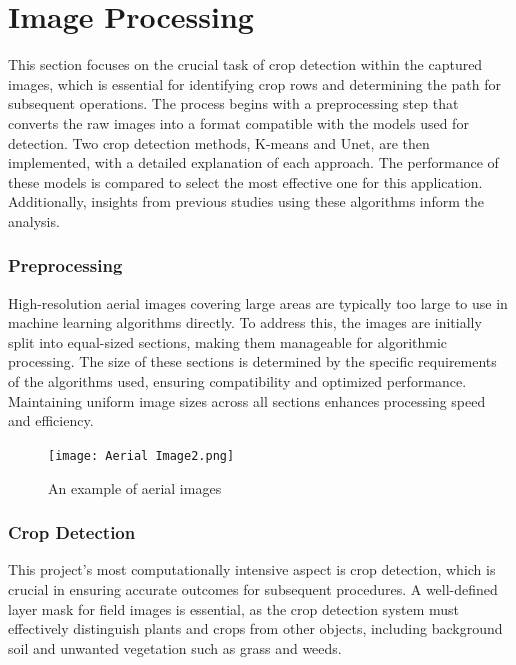 \documentclass[conference]{IEEEtran}
\begin{document}
\section{Image Processing}
This section focuses on the crucial task of crop detection within the captured images, which is essential for identifying crop rows and determining the path for subsequent operations. The process begins with a preprocessing step that converts the raw images into a format compatible with the models used for detection. Two crop detection methods, K-means and Unet, are then implemented, with a detailed explanation of each approach. The performance of these models is compared to select the most effective one for this application. Additionally, insights from previous studies using these algorithms inform the analysis.



\subsubsection{Preprocessing}
High-resolution aerial images covering large areas are typically too large to use in machine learning algorithms directly. To address this, the images are initially split into equal-sized sections, making them manageable for algorithmic processing. The size of these sections is determined by the specific requirements of the algorithms used, ensuring compatibility and optimized performance. Maintaining uniform image sizes across all sections enhances processing speed and efficiency.

\begin{figure}[htbp]
\texttt{[image: Aerial Image2.png]}
\caption{An example of aerial images}
\label{fig1}
\end{figure}

\subsubsection{Crop Detection}
This project's most computationally intensive aspect is crop detection, which is crucial in ensuring accurate outcomes for subsequent procedures. A well-defined layer mask for field images is essential, as the crop detection system must effectively distinguish plants and crops from other objects, including background soil and unwanted vegetation such as grass and weeds. 
\end{document}
